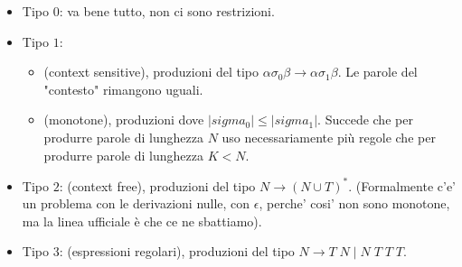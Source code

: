 \begin{itemize}
  \item Tipo $0$: va bene tutto, non ci sono restrizioni.
  \item Tipo $1$:
  \begin{itemize}
    \item (context sensitive), produzioni del tipo $\alpha \sigma_0 \beta \rightarrow \alpha \sigma_1 \beta$. Le parole del "contesto" rimangono uguali.
    \item (monotone), produzioni dove $|sigma_0| \leq |sigma_1|$. Succede che per produrre parole di lunghezza $N$ uso necessariamente pi\`u regole che per produrre parole di lunghezza $K < N$.
  \end{itemize}
\item Tipo $2$: (context free), produzioni del tipo $N \rightarrow (N \cup T)^{*}$. (Formalmente c'e' un problema con le derivazioni nulle, con $\epsilon$, perche' cosi' non sono monotone, ma la linea ufficiale \`e che ce ne sbattiamo).
  \item Tipo $3$: (espressioni regolari), produzioni del tipo $N \rightarrow T \; N \; | \; N \; T \; T \; T$.
\end{itemize}
